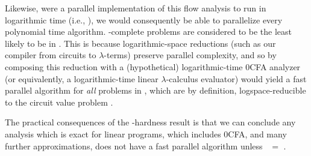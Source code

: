 Likewise, were a parallel implementation of this flow analysis to run
in logarithmic time (i.e., \nc), we would consequently be able to
parallelize every polynomial time algorithm.  \ptime-complete problems
are considered to be the least likely to be in \nc.  This is because
logarithmic-space reductions (such as our compiler from circuits to
$\lambda$-terms) preserve parallel complexity, and so by composing
this reduction with a (hypothetical) logarithmic-time 0CFA analyzer
(or equivalently, a logarithmic-time linear $\lambda$-calculus
evaluator) would yield a fast parallel algorithm for {\em all}
problems in \ptime, which are by definition, logspace-reducible to the
circuit value problem \cite[page 377]{Papadimitriou94}.

The practical consequences of the \ptime-hardness result is that we
can conclude any analysis which is exact for linear programs, which
includes 0CFA, and many further approximations, does not have a fast
parallel algorithm unless \ptime\ $=$ \nc.
